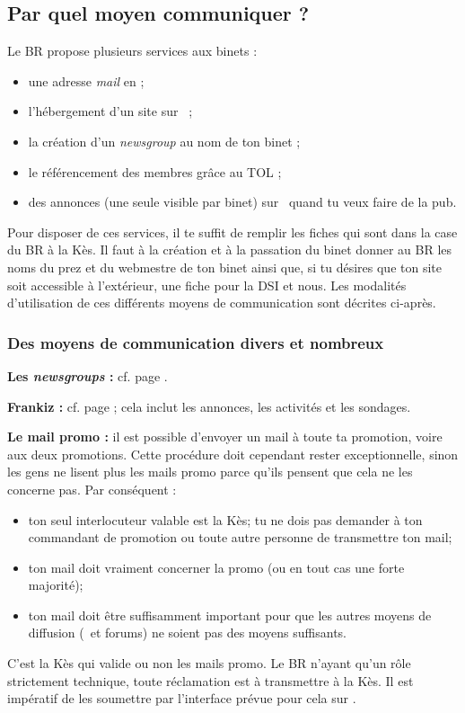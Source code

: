 \subsection{Par quel moyen communiquer ?}

Le BR propose plusieurs services aux binets :
\begin{itemize}
\item une adresse \emph{mail} en  ;
\item l'hébergement d'un site sur \fkz\ ;
\item la création d'un \emph{newsgroup} au nom de ton binet ;
\item le référencement des membres grâce au TOL ;
\item des annonces (une seule visible par binet) sur \fkz\ quand tu veux faire de la pub.
\end{itemize}

Pour disposer de ces services, il te suffit de remplir les fiches qui sont dans la case du BR à la Kès. Il faut à la création et à la passation du binet
donner au BR les noms du prez et du webmestre de ton binet ainsi que, si tu désires que ton site soit accessible à l'extérieur, une fiche pour la DSI et nous. Les modalités d'utilisation de ces différents moyens de communication sont décrites ci-après.

\subsubsection{Des moyens de communication divers et nombreux}

\textbf{Les \emph{newsgroups} :} cf. page \pageref{newsgroups}.

\textbf{Frankiz :} cf. page \pageref{frankiz} ; cela inclut les annonces, les activités et les sondages.

\textbf{Le mail promo :} il est possible d'envoyer un mail à toute
ta promotion, voire aux deux promotions. Cette procédure doit
cependant rester exceptionnelle, sinon les gens ne lisent plus les
mails promo parce qu'ils pensent que cela ne les concerne pas. Par
conséquent :
\begin{itemize}
  \item ton seul interlocuteur valable est la Kès; tu ne dois pas demander à ton commandant de promotion
        ou toute autre personne de transmettre ton mail;
  \item ton mail doit vraiment concerner la promo (ou en tout cas une forte majorité);
  \item ton mail doit être suffisamment important pour que les autres moyens de diffusion (\fkz\ et forums) ne soient pas des moyens suffisants.
\end{itemize}
C'est la Kès qui valide ou non les mails promo. Le BR n'ayant qu'un rôle strictement technique, toute réclamation est à transmettre à la Kès. Il est
impératif de les soumettre par l'interface prévue pour cela sur \fkz.

